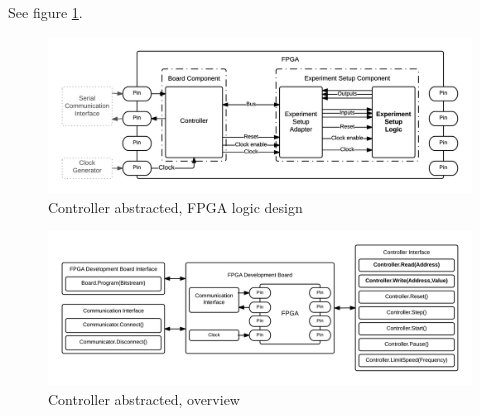\documentclass[openright]{uva-bachelor-thesis}
\begin{document}

















See figure \ref{fig:fpga-abstract}.

\begin{figure}[h]
\centering
\includegraphics[width=.8\textwidth]{fpga-abstract}
\caption{Controller abstracted, FPGA logic design}
\label{fig:fpga-abstract}
\end{figure}


\begin{figure}[h]
\centering
\includegraphics[width=\textwidth]{overview-abstract}
\caption{Controller abstracted, overview}
\label{fig:overview-abstract}
\end{figure}
\end{document}

